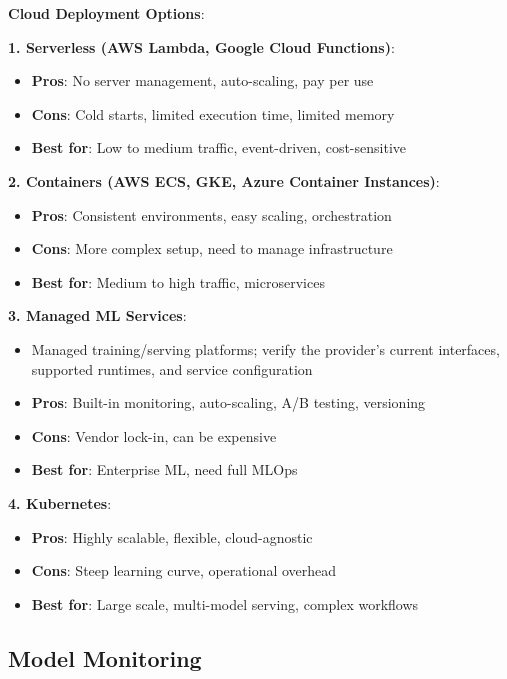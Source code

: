 \documentclass[11pt,twoside]{article}
\numberwithin{equation}{section}
\theoremstyle{plain}
\theoremstyle{definition}
\theoremstyle{remark}
\newenvironment{keyidea}{
  \begin{tcolorbox}[colback=yellow!5!white,
                    colframe=yellow!50!black,
                    title=Key Idea,
                    breakable,
                    enhanced,
                    sharp corners,
                    boxrule=0.8pt,
                    left=6pt, right=6pt, top=6pt, bottom=6pt]
}{
  \end{tcolorbox}
}
\begin{document}
\begin{keyidea}
\textbf{Cloud Deployment Options}:

\textbf{1. Serverless (AWS Lambda, Google Cloud Functions)}:
\begin{itemize}
\item \textbf{Pros}: No server management, auto-scaling, pay per use
\item \textbf{Cons}: Cold starts, limited execution time, limited memory
\item \textbf{Best for}: Low to medium traffic, event-driven, cost-sensitive
\end{itemize}

\textbf{2. Containers (AWS ECS, GKE, Azure Container Instances)}:
\begin{itemize}
\item \textbf{Pros}: Consistent environments, easy scaling, orchestration
\item \textbf{Cons}: More complex setup, need to manage infrastructure
\item \textbf{Best for}: Medium to high traffic, microservices
\end{itemize}

\textbf{3. Managed ML Services}:
\begin{itemize}
\item Managed training/serving platforms; verify the provider's current interfaces, supported runtimes, and service configuration
\item \textbf{Pros}: Built-in monitoring, auto-scaling, A/B testing, versioning
\item \textbf{Cons}: Vendor lock-in, can be expensive
\item \textbf{Best for}: Enterprise ML, need full MLOps
\end{itemize}

\textbf{4. Kubernetes}:
\begin{itemize}
\item \textbf{Pros}: Highly scalable, flexible, cloud-agnostic
\item \textbf{Cons}: Steep learning curve, operational overhead
\item \textbf{Best for}: Large scale, multi-model serving, complex workflows
\end{itemize}
\end{keyidea}

\subsection{Model Monitoring}
\end{document}
